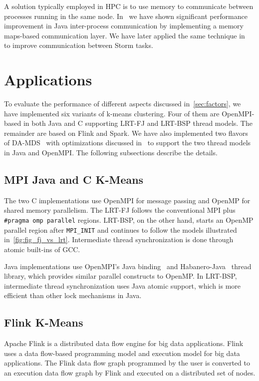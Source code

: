 \documentclass[10pt, conference, compsocconf]{IEEEtran}
\begin{document}
A solution typically employed in \ac{HPC} is to use memory to communicate between processes running in the same node. In~\cite{hpc2016:spidaljava} we have shown significant performance improvement in Java inter-process communication by implementing a memory maps-based communication layer. We have later applied the same technique in~\cite{kamburugamuve2016towards} to improve communication between Storm tasks.

\section{Applications} \label{sec:applications}
To evaluate the performance of different aspects discussed in~\ref{sec:factors}, we have implemented six variants of k-means clustering. Four of them are OpenMPI-based in both Java and C supporting \ac{LRT-FJ} and \ac{LRT-BSP} thread models. The remainder are based on Flink and Spark. We have also implemented two flavors of \ac{DA-MDS}~\cite{Ruan:2013:RSS:2547685.2547700} with optimizations discussed in~\cite{hpc2016:spidaljava} to support the two thread models in Java and OpenMPI. The following subsections describe the details.

\subsection{\ac{MPI} Java and C K-Means}
The two C implementations use OpenMPI for message passing and OpenMP for shared memory parallelism. The \ac{LRT-FJ} follows the conventional \ac{MPI} plus \texttt{\#pragma omp parallel} regions. \ac{LRT-BSP}, on the other hand, starts an OpenMP parallel region after \texttt{MPI\_INIT} and continues to follow the models illustrated in~\ref{fig:fig_fj_vs_lrt}. Intermediate thread synchronization is done through atomic built-ins of \ac{GCC}. 

Java implementations use OpenMPI's Java binding~\cite{Vega-Gisbert:2013:TAJ:2488551.2488599,ompi-java-impl} and Habanero-Java~\cite{Imam:2014:HLJ:2647508.2647514} thread library, which provides similar parallel constructs to OpenMP. In \ac{LRT-BSP}, intermediate thread synchronization uses Java atomic support, which is more efficient than other lock mechanisms in Java. 


\subsection{Flink K-Means}
Apache Flink is a distributed data flow engine for big data applications. Flink uses a data flow-based programming model and execution model for big data applications. The Flink data flow graph programmed by the user is converted to an execution data flow graph by Flink and executed on a distributed set of nodes.
\end{document}
